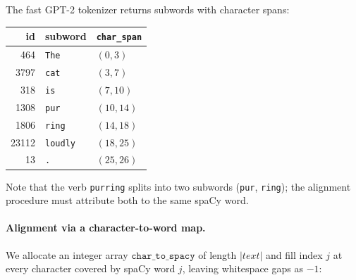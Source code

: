 \documentclass{article}
\begin{document}
The fast GPT-2 tokenizer returns subwords with character spans:

\begin{center}
\begin{tabular}{rll}
\toprule
id & subword & \texttt{char\_span} \\
\midrule
464   & \texttt{The}                       & $(0,3)$   \\
3797  & \texttt{\textvisiblespace cat}     & $(3,7)$   \\
318   & \texttt{\textvisiblespace is}      & $(7,10)$  \\
1308  & \texttt{\textvisiblespace pur}     & $(10,14)$ \\
1806  & \texttt{ring}                      & $(14,18)$ \\
23112 & \texttt{\textvisiblespace loudly}  & $(18,25)$ \\
13    & \texttt{.}                         & $(25,26)$ \\
\bottomrule
\end{tabular}
\end{center}

Note that the verb \texttt{purring} splits into two subwords
(\texttt{\textvisiblespace pur}, \texttt{ring}); the alignment procedure must
attribute both to the same spaCy word.

\paragraph{Alignment via a character-to-word map.} We allocate an integer
array $\mathtt{char\_to\_spacy}$ of length $|text|$ and fill index $j$ at
every character covered by spaCy word $j$, leaving whitespace gaps as $-1$:

\begin{center}
\end{center}
\end{document}
